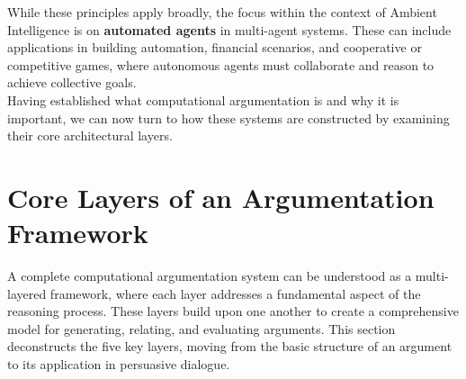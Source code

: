 \documentclass{scrbook}
\begin{document}
While these principles apply broadly, the focus within the context of Ambient Intelligence is on \textbf{automated agents} in multi-agent systems. These can include applications in building automation, financial scenarios, and cooperative or competitive games, where autonomous agents must collaborate and reason to achieve collective goals. \\

Having established what computational argumentation is and why it is important, we can now turn to how these systems are constructed by examining their core architectural layers.

\chapter{Core Layers of an Argumentation Framework}

A complete computational argumentation system can be understood as a multi-layered framework, where each layer addresses a fundamental aspect of the reasoning process. These layers build upon one another to create a comprehensive model for generating, relating, and evaluating arguments. This section deconstructs the five key layers, moving from the basic structure of an argument to its application in persuasive dialogue. \\
\end{document}
